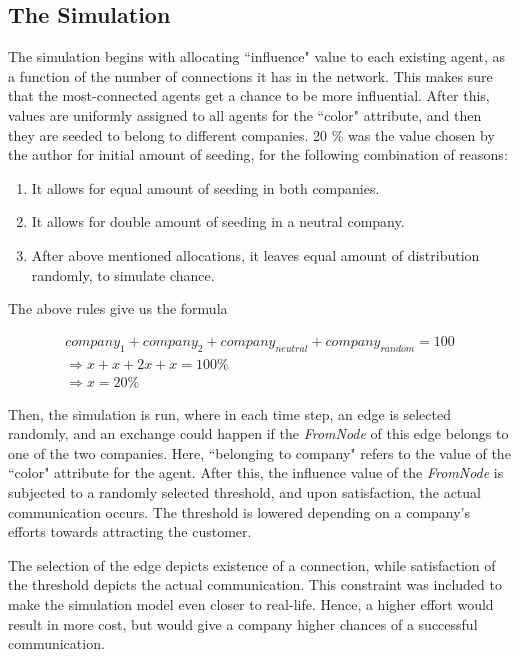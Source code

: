 \subsection{The Simulation} 
 
The simulation begins with allocating ``influence" value to each existing agent, as a function of the number of connections it has in the network. This makes sure that the most-connected agents get a chance to be more influential. 
After this, values are uniformly assigned to all agents for the ``color" attribute, and then they are seeded to belong to different companies. 20 \% was the value chosen by the author for initial amount of seeding, for the following combination of reasons:

\begin{enumerate}
\item It allows for equal amount of seeding in both companies.
\item It allows for double amount of seeding in a neutral company.
\item After above mentioned allocations, it leaves equal amount of distribution randomly, to simulate chance.
\end{enumerate}

The above rules give us the formula

\begin{eqnarray}
company_1 + company_2 + company_{neutral} + company_{random} = 100 \nonumber \\
\Rightarrow x + x + 2x + x = 100 \% \nonumber \\
\Rightarrow x = 20 \% 
\label{eqn:seed fraction}
\end{eqnarray}

Then, the simulation is run, where in each time step, an edge is selected randomly, and an exchange could happen if the \textit{FromNode} of this edge belongs to one of the two companies. Here, ``belonging to company" refers to the value of the ``color" attribute for the agent.
After this, the influence value of the \textit{FromNode} is subjected to a randomly selected threshold, and upon satisfaction, the actual communication occurs. The threshold is lowered depending on a company's efforts towards attracting the customer. 

The selection of the edge depicts existence of a connection, while satisfaction of the threshold depicts the actual communication. This constraint was included to make the simulation model even closer to real-life. 
Hence, a higher effort would result in more cost, but would give a company higher chances of a successful communication.

